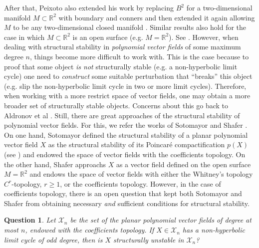 \documentclass[11pt]{amsart}
\newtheorem{question}{Question}
\begin{document}
After that, Peixoto also extended his work by replacing $B^2$ for a two-dimensional manifold $M\subset\mathbb{R}^2$ with boundary and conners \cite{PeiPei1959} and then extended it again allowing $M$ to be any two-dimensional closed manifold \cite{Pei1962}. Similar results also hold for the case in which $M\subset\mathbb{R}^2$ is an open surface (e.g. $M=\mathbb{R}^2$). See \cite{Kot1982}. However, when dealing with structural stability in \emph{polynomial vector fields} of some maximum degree $n$, things become more difficult to work with. This is the case because to proof that some object \emph{is not} structurally stable (e.g. a non-hyperbolic limit cycle) one need to \emph{construct} some suitable perturbation that ``breaks'' this object (e.g. slip the non-hyperbolic limit cycle in two or more limit cycles). Therefore, when working with a more restrict space of vector fields, one may obtain a more broader set of structurally stable objects. Concerns about this go back to Aldronov et al \cite[$\mathsection6.3$]{And1971}. Still, there are great approaches of the structural stability of polynomial vector fields. For this, we refer the works of Sotomayor \cite{Soto1985} and Shafer \cite{Sha1987}. On one hand, Sotomayor \cite{Soto1985} defined the structural stability of a planar polynomial vector field $X$ as the structural stability of its Poincar\'e compactification $p(X)$ (see \cite[Chapter $5$]{DumLliArt2006}) and endowed the space of vector fields with the coefficients topology. On the other hand, Shafer \cite{Sha1987} approachs $X$ as a vector field defined on the open surface $M=\mathbb{R}^2$ and endows the space of vector fields with either the Whitney's topology $C^r$-topology, $r\geqslant 1$, or the coefficients topology. However, in the case of coefficients topology, there is an open question that kept both Sotomayor and Shafer from obtaining necessary \emph{and} sufficient conditions for structural stability.

\begin{question}\label{Q1}
	Let $\mathcal{X}_n$ be the set of the planar polynomial vector fields of degree at most $n$, endowed with the coefficients topology. If $X\in\mathcal{X}_n$ has a non-hyperbolic limit cycle of odd degree, then is $X$ structurally unstable in $\mathcal{X}_n$?
\end{question}
\end{document}
